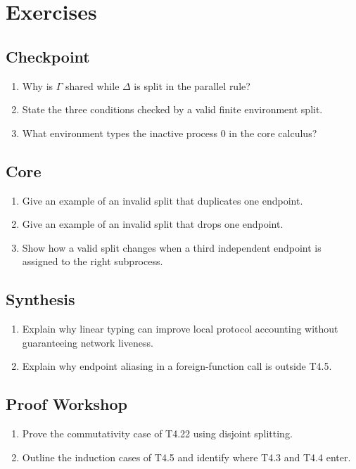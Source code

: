 \section{Exercises}
\subsection*{Checkpoint}
\begin{enumerate}[label=\textbf{5.\arabic*},start=1]
\item Why is $\Gamma$ shared while $\Delta$ is split in the parallel rule?
\item State the three conditions checked by a valid finite environment split.
\item What environment types the inactive process $0$ in the core calculus?
\end{enumerate}
\subsection*{Core}
\begin{enumerate}[label=\textbf{5.\arabic*},start=4]
\item Give an example of an invalid split that duplicates one endpoint.
\item Give an example of an invalid split that drops one endpoint.
\item Show how a valid split changes when a third independent endpoint is assigned to the right subprocess.
\end{enumerate}
\subsection*{Synthesis}
\begin{enumerate}[label=\textbf{5.\arabic*},start=7]
\item Explain why linear typing can improve local protocol accounting without guaranteeing network liveness.
\item Explain why endpoint aliasing in a foreign-function call is outside T4.5.
\end{enumerate}
\subsection*{Proof Workshop}
\begin{enumerate}[label=\textbf{5.\arabic*},start=9]
\item Prove the commutativity case of T4.22 using disjoint splitting.
\item Outline the induction cases of T4.5 and identify where T4.3 and T4.4 enter.
\end{enumerate}
